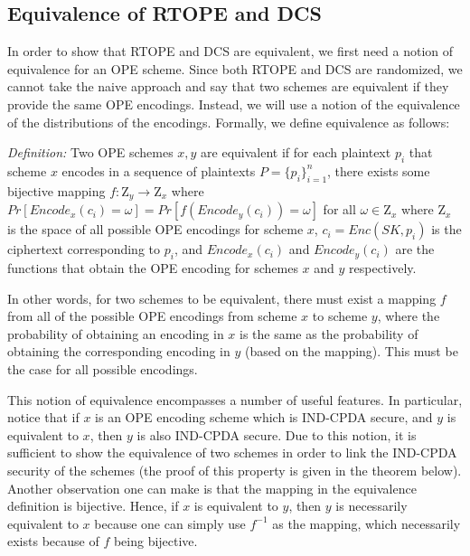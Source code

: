 \documentclass[12pt]{article}
\begin{document}
  \subsection{Equivalence of RTOPE and DCS}

  In order to show that RTOPE and DCS are equivalent, we first need a notion of equivalence for an OPE scheme. Since both RTOPE and DCS are randomized, we cannot take the naive approach and say that two schemes are equivalent if they provide the same OPE encodings. Instead, we will use a notion of the equivalence of the distributions of the encodings. Formally, we define equivalence as follows:

  \emph{Definition:} Two OPE schemes $x,y$ are equivalent if for each plaintext $p_i$ that scheme $x$ encodes in a sequence of plaintexts $P = \{p_i\}_{i=1}^n$, there exists some bijective mapping $f: \mathrm{Z}_y \to \mathrm{Z}_x$ where $Pr[Encode_x(c_i) = \omega] = Pr[f(Encode_y(c_i)) = \omega]$ for all $\omega \in \mathrm{Z}_x$ where $\mathrm{Z}_x$ is the space of all possible OPE encodings for scheme $x$, $c_i = Enc(SK, p_i)$ is the ciphertext corresponding to $p_i$, and $Encode_x(c_i)$ and $Encode_y(c_i)$ are the functions that obtain the OPE encoding for schemes $x$ and $y$ respectively.

  In other words, for two schemes to be equivalent, there must exist a mapping $f$ from all of the possible OPE encodings from scheme $x$ to scheme $y$, where the probability of obtaining an encoding in $x$ is the same as the probability of obtaining the corresponding encoding in $y$ (based on the mapping). This must be the case for all possible encodings.

  This notion of equivalence encompasses a number of useful features. In particular, notice that if $x$ is an OPE encoding scheme which is IND-CPDA secure, and $y$ is equivalent to $x$, then $y$ is also IND-CPDA secure. Due to this notion, it is sufficient to show the equivalence of two schemes in order to link the IND-CPDA security of the schemes (the proof of this property is given in the theorem below). Another observation one can make is that the mapping in the equivalence definition is bijective. Hence, if $x$ is equivalent to $y$, then $y$ is necessarily equivalent to $x$ because one can simply use $f^{-1}$ as the mapping, which necessarily exists because of $f$ being bijective.
\end{document}
